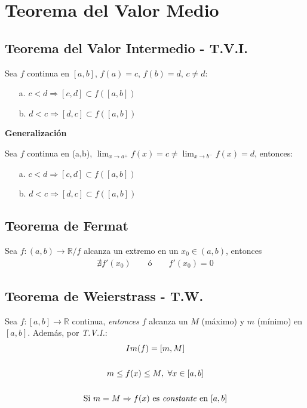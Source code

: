 \documentclass[11pt,titlepage]{article}
\newcommand{\commLim}[2]{\lim_{#1 \to #2}}
\newcommand{\littleTitle}[1]{
	\noindent \ignorespaces
	\small \textbf{#1} \normalsize
	\ignorespaces \ignorespacesafterend
}
\begin{document}
\vspace{1.5cm}
\section{Teorema del Valor Medio}

\subsection{Teorema del Valor Intermedio - T.V.I.}
Sea $f$ continua en $[a,b]$, $f(a) = c$, $f(b) = d$, $c \neq d$:
\begin{itemize}
	\item[a.] $c < d \Rightarrow [c,d] \subset f\left([a,b]\right)$
	\item[b.] $d < c \Rightarrow [d,c] \subset f\left([a,b]\right)$
\end{itemize}
\littleTitle{Generalización}\par
Sea $f$ continua en (a,b), $\commLim{x}{a^{+}} f(x) = c \neq \commLim{x}{b^{-}} f(x) = d$, entonces:
\begin{itemize}
	\item[a.] $c < d \Rightarrow [c,d] \subset f\left([a,b]\right)$
	\item[b.] $d < c \Rightarrow [d,c] \subset f\left([a,b]\right)$
\end{itemize}

\subsection{Teorema de Fermat}
Sea $f: (a,b) \to \mathbb{R} / f$ alcanza un extremo en un $x_0 \in (a,b)$, entonces
\begin{gather}
	\nexists f'(x_0) \qquad \text{ó} \qquad f'(x_0) = 0
\end{gather}

\subsection{Teorema de Weierstrass - T.W.} \label{tw}
\begin{commBoxy}
	Sea $f: [a,b] \to \mathbb{R}$ continua, \emph{entonces} $f$ alcanza un $M$ (máximo) y $m$ (mínimo) en $[a,b]$.
	Además, por \emph{T.V.I.}:
	\begin{gather*}
		Im(f) = [m,M] \\ \\
		m \leq f(x) \leq M, \ \forall x \in [a,b] \\ \\
		\text{Si } m = M \Rightarrow f(x) \text{ es \emph{constante} en } [a,b]
	\end{gather*}
\end{commBoxy}
\end{document}
